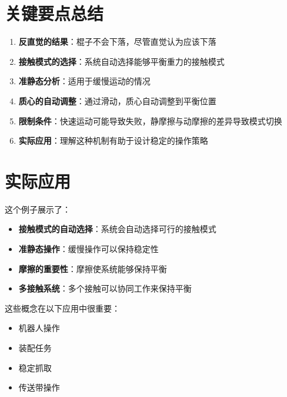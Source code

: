 \documentclass[12pt,a4paper]{article}
\begin{document}
\section{关键要点总结}

\begin{enumerate}
    \item \textbf{反直觉的结果}：棍子不会下落，尽管直觉认为应该下落
    
    \item \textbf{接触模式的选择}：系统自动选择能够平衡重力的接触模式
    
    \item \textbf{准静态分析}：适用于缓慢运动的情况
    
    \item \textbf{质心的自动调整}：通过滑动，质心自动调整到平衡位置
    
    \item \textbf{限制条件}：快速运动可能导致失败，静摩擦与动摩擦的差异导致模式切换
    
    \item \textbf{实际应用}：理解这种机制有助于设计稳定的操作策略
\end{enumerate}

\section{实际应用}

这个例子展示了：

\begin{itemize}
    \item \textbf{接触模式的自动选择}：系统会自动选择可行的接触模式
    \item \textbf{准静态操作}：缓慢操作可以保持稳定性
    \item \textbf{摩擦的重要性}：摩擦使系统能够保持平衡
    \item \textbf{多接触系统}：多个接触可以协同工作来保持平衡
\end{itemize}

这些概念在以下应用中很重要：
\begin{itemize}
    \item 机器人操作
    \item 装配任务
    \item 稳定抓取
    \item 传送带操作
\end{itemize}
\end{document}
